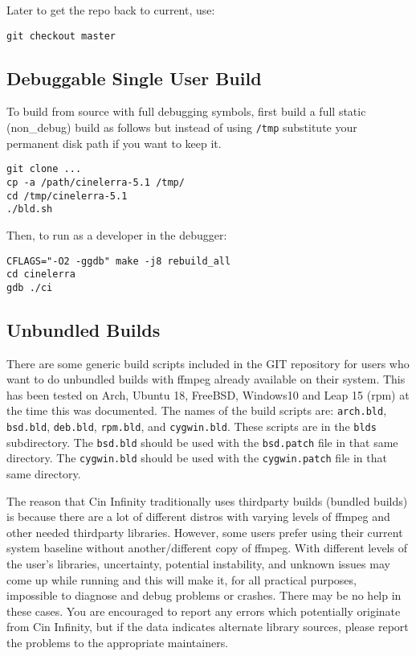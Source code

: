 Later to get the repo back to current, use:
\begin{lstlisting}[style=sh]
git checkout master
\end{lstlisting}


\subsection{Debuggable Single User Build}%
\label{sub:debuggable_single_user_build}

To build from source with full debugging symbols, first build a full
static (non\_debug) build as follows but instead of using
\texttt{/tmp} substitute your permanent disk path if you want to
keep it.

\begin{lstlisting}[style=sh]
git clone ...
cp -a /path/cinelerra-5.1 /tmp/
cd /tmp/cinelerra-5.1
./bld.sh
\end{lstlisting}

Then, to run as a developer in the debugger:

\begin{lstlisting}[style=sh]
CFLAGS="-O2 -ggdb" make -j8 rebuild_all
cd cinelerra
gdb ./ci
\end{lstlisting}


\subsection{Unbundled Builds}%
\label{sub:unbundled_builds}

There are some generic build scripts included in the \CGG{} GIT
repository for users who want to do unbundled builds with ffmpeg
already available on their system.  This has been tested on Arch,
Ubuntu 18, FreeBSD, Windows10 and Leap 15 (rpm) at the time this
was documented.
%
The names of the build scripts are: \texttt{arch.bld},
\texttt{bsd.bld}, \texttt{deb.bld}, \texttt{rpm.bld}, and
\texttt{cygwin.bld}.  These scripts are in the \texttt{blds}
subdirectory.  The \texttt{bsd.bld} should be used with the
\texttt{bsd.patch} file in that same directory.  The
\texttt{cygwin.bld} should be used with the \texttt{cygwin.patch}
file in that same directory.

The reason that Cin Infinity traditionally uses thirdparty builds
(bundled builds) is because there are a lot of different distros
with varying levels of ffmpeg and other needed thirdparty
libraries.  However, some users prefer using their current system
baseline without another/different copy of ffmpeg.
%
With different levels of the user’s libraries, uncertainty,
potential instability, and unknown issues may come up while
running \CGG{} and this will make it, for all practical purposes,
impossible to diagnose and debug problems or crashes.
%
There may be no help in these cases.  You are encouraged to report
any errors which potentially originate from Cin Infinity, but if
the data indicates alternate library sources, please report the
problems to the appropriate maintainers.

